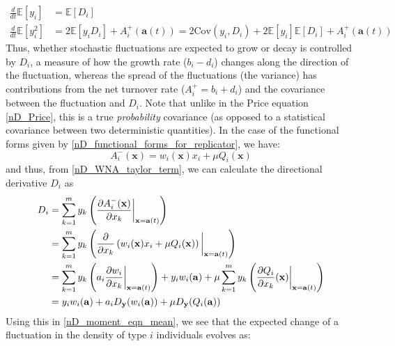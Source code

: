 \begin{align}
\frac{d}{dt}\mathbb{E}[y_i] &= \mathbb{E}[D_{i}]\label{nD_moment_eqn_mean}\\
\frac{d}{dt}\mathbb{E}[y_i^2] &= 2\mathbb{E}[y_iD_{i}] +  A_i^+(\mathbf{a}(t)) = 2\mathrm{Cov}(y_i,D_i) + 2\mathbb{E}[y_i]\mathbb{E}[D_i]+A_i^+(\mathbf{a}(t))\label{nD_moment_eqn_2nd_mom}
\end{align}
Thus, whether stochastic fluctuations are expected to grow or decay is controlled by $D_i$, a measure of how the growth rate ($b_i - d_i$) changes along the direction of the fluctuation, whereas the spread of the fluctuations (the variance) has contributions from the net turnover rate ($A_i^+ = b_i + d_i$) and the covariance between the fluctuation and $D_i$. Note that unlike in the Price equation \eqref{nD_Price}, this is a true \emph{probability} covariance (as opposed to a statistical covariance between two deterministic quantities). In the case of the functional forms given by \eqref{nD_functional_forms_for_replicator}, we have:
\begin{equation}
A_i^-(\mathbf{x}) = w_i(\mathbf{x})x_i + \mu Q_i(\mathbf{x})
\end{equation}
and thus, from \eqref{nD_WNA_taylor_term}, we can calculate the directional derivative $D_i$ as
\begin{align}
D_i &= \sum\limits_{k=1}^{m} y_k\left(\frac{\partial A^{-}_i(\mathbf{x})}{\partial x_k}\bigg{|}_{\mathbf{x}=\mathbf{a}(t)}\right)\\
&= \sum\limits_{k=1}^{m} y_k\left(\frac{\partial}{\partial x_k}\left( w_i(\mathbf{x})x_i + \mu Q_i(\mathbf{x})\right)\bigg{|}_{\mathbf{x}=\mathbf{a}(t)}\right)\\
&= \sum\limits_{k=1}^{m} y_k\left(a_i\frac{\partial w_i}{\partial x_k}\bigg{|}_{\mathbf{x}=\mathbf{a}(t)}\right) + y_iw_i(\mathbf{a}) + \mu\sum\limits_{k=1}^{m} y_k\left(\frac{\partial Q_i}{\partial x_k}(\mathbf{x})\bigg{|}_{\mathbf{x}=\mathbf{a}(t)}\right)\\
&= y_iw_i(\mathbf{a}) + a_iD_{\mathbf{y}}(w_i(\mathbf{a})) + \mu D_{\mathbf{y}}(Q_i(\mathbf{a}))\label{nD_WNA_directional_derivative_for_replicator_eqns}
\end{align}
Using this in \eqref{nD_moment_eqn_mean}, we see that the expected change of a fluctuation in the density of type $i$ individuals evolves as:
